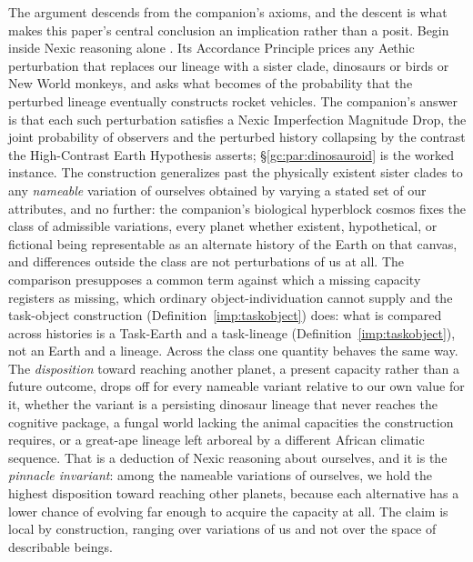 The argument descends from the companion's axioms, and the descent is
what makes this paper's central conclusion an implication rather than
a posit. Begin inside Nexic reasoning alone \cite{Nexus}. Its
Accordance Principle prices any Aethic perturbation that replaces our
lineage with a sister clade, dinosaurs or birds or New World monkeys,
and asks what becomes of the probability that the perturbed lineage
eventually constructs rocket vehicles. The companion's answer is that
each such perturbation satisfies a Nexic Imperfection Magnitude Drop,
the joint probability of observers and the perturbed history
collapsing by the contrast the High-Contrast Earth Hypothesis
asserts; \S\ref{gc:par:dinosauroid} is the worked instance. The
construction generalizes past the physically existent sister clades
to any \emph{nameable} variation of ourselves obtained by varying a
stated set of our attributes, and no further: the companion's
biological hyperblock cosmos fixes the class of admissible
variations, every planet whether existent, hypothetical, or fictional
being representable as an alternate history of the Earth on that
canvas, and differences outside the class are not perturbations of
us at all. The comparison presupposes a common term against which a
missing capacity registers as missing, which ordinary
object-individuation cannot supply and the task-object construction (Definition~\ref{imp:taskobject}) does: what is
compared across histories is a Task-Earth and a task-lineage
(Definition~\ref{imp:taskobject}), not an Earth and a lineage.
Across the class one quantity behaves the same way. The
\emph{disposition} toward reaching another planet, a present capacity
rather than a future outcome, drops off for every nameable variant
relative to our own value for it, whether the variant is a persisting
dinosaur lineage that never reaches the cognitive package, a fungal
world lacking the animal capacities the construction requires, or a
great-ape lineage left arboreal by a different African climatic
sequence. That is a deduction of Nexic reasoning about ourselves, and
it is the \emph{pinnacle invariant}: among the nameable variations of
ourselves, we hold the highest disposition toward reaching other
planets, because each alternative has a lower chance of evolving far
enough to acquire the capacity at all. The claim is local by
construction, ranging over variations of us and not over the space of
describable beings.

